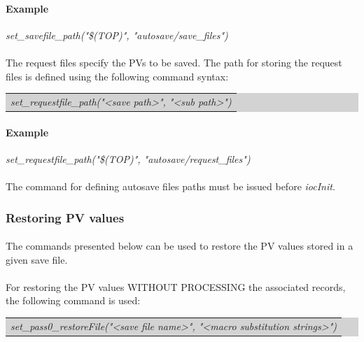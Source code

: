 \documentclass[openany]{article}
\begin{document}
			\paragraph{Example} \emph{set\_savefile\_path("\$(TOP)", "autosave/save\_files")}

			\paragraph{} The request files specify the PVs to be saved. The path for storing the request files is defined using the following command syntax:

			\bigskip
			\colorbox{lightgray}{
				\begin{tabularx}{0.9\textwidth}{X}
				\emph{set\_requestfile\_path("\textless save path\textgreater", "\textless sub path\textgreater")}
				\end{tabularx}
			}

			\paragraph{Example} \emph{set\_requestfile\_path("\$(TOP)", "autosave/request\_files")}

			\paragraph{} {\color{red}The command for defining autosave files paths must be issued before \emph{iocInit}.}

		\subsubsection{Restoring PV values}

			\paragraph{} The commands presented below can be used to restore the PV values stored in a given save file.

			\paragraph{} For restoring the PV values WITHOUT PROCESSING the associated records, the following command is used:

			\bigskip
			\colorbox{lightgray}{
				\begin{tabularx}{0.9\textwidth}{X}
				\emph{set\_pass0\_restoreFile("\textless save file name\textgreater", "\textless macro substitution strings\textgreater")}
				\end{tabularx}
			}
\end{document}
